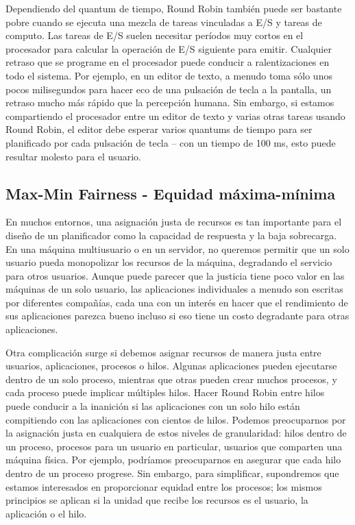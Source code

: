 \documentclass[10pt]{book}
\begin{document}
Dependiendo del quantum de tiempo, Round Robin también puede ser bastante pobre cuando se ejecuta una mezcla de tareas vinculadas a E/S y tareas de computo. Las tareas de E/S suelen necesitar períodos muy cortos en el procesador para calcular la operación de E/S siguiente para emitir. Cualquier retraso que se programe en el procesador puede conducir a ralentizaciones en todo el sistema. Por ejemplo, en un editor de texto, a menudo toma sólo unos pocos milisegundos para hacer eco de una pulsación de tecla a la pantalla, un retraso mucho más rápido que la percepción humana. Sin embargo, si estamos compartiendo el procesador entre un editor de texto y varias otras tareas usando Round Robin, el editor debe esperar varios quantums de tiempo para ser planificado por cada pulsación de tecla -- con un tiempo de 100 ms, esto puede resultar molesto para el usuario.

\subsection{Max-Min Fairness - Equidad máxima-mínima}
En muchos entornos, una asignación justa de recursos es tan importante para el diseño de un planificador como la capacidad de respuesta y la baja sobrecarga. En una máquina multiusuario o en un servidor, no queremos permitir que un solo usuario pueda monopolizar los recursos de la máquina, degradando el servicio para otros usuarios. Aunque puede parecer que la justicia tiene poco valor en las máquinas de un solo usuario, las aplicaciones individuales a menudo son escritas por diferentes compañías, cada una con un interés en hacer que el rendimiento de sus aplicaciones parezca bueno incluso si eso tiene un costo degradante para otras aplicaciones.

Otra complicación surge si debemos asignar recursos de manera justa entre usuarios, aplicaciones, procesos o hilos. Algunas aplicaciones pueden ejecutarse dentro de un solo proceso, mientras que otras pueden crear muchos procesos, y cada proceso puede implicar múltiples hilos. Hacer Round Robin entre hilos puede conducir a la inanición si las aplicaciones con un solo hilo están compitiendo con las aplicaciones con cientos de hilos. Podemos preocuparnos por la asignación justa en cualquiera de estos niveles de granularidad: hilos dentro de un proceso, procesos para un usuario en particular, usuarios que comparten una máquina física. Por ejemplo, podríamos preocuparnos en asegurar que cada hilo dentro de un proceso progrese. Sin embargo, para simplificar, supondremos que estamos interesados en proporcionar equidad entre los procesos; los mismos principios se aplican si la unidad que recibe los recursos es el usuario, la aplicación o el hilo.
\end{document}
